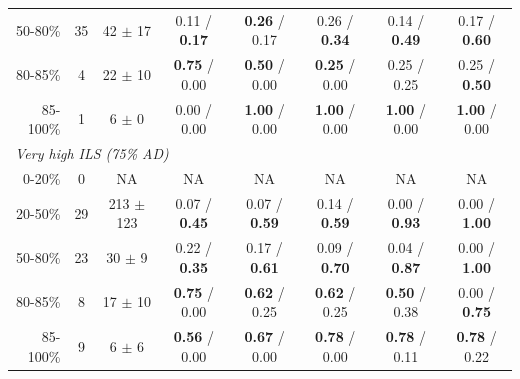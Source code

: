 \begin{landscape}
\begin{table}[!h]
\begin{tabular}{rc cccccc}
50-80\%  & 35 & 42 $\pm$ 17  & 0.11 / {\bf 0.17} & {\bf 0.26} / 0.17 & 0.26 / {\bf 0.34} & 0.14 / {\bf 0.49} & 0.17 / {\bf 0.60} \\[0.5ex]
80-85\%  & 4 & 22 $\pm$ 10  & {\bf 0.75} / 0.00 & {\bf 0.50} / 0.00 & {\bf 0.25} / 0.00 & 0.25 / 0.25 & 0.25 / {\bf 0.50} \\[0.5ex]
85-100\%  & 1 & 6 $\pm$ 0  & 0.00 / 0.00 & {\bf 1.00} / 0.00 & {\bf 1.00} / 0.00 & {\bf 1.00} / 0.00 & {\bf 1.00} / 0.00 \\[2ex]
\multicolumn{8}{l}{\em Very high ILS (75\% AD)}\\[0.5ex]
0-20\%  & 0 & NA & NA & NA & NA & NA & NA \\[0.5ex]
20-50\%  & 29 & 213 $\pm$ 123  & 0.07 / {\bf 0.45} & 0.07 / {\bf 0.59} & 0.14 / {\bf 0.59} & 0.00 / {\bf 0.93} & 0.00 / {\bf 1.00} \\[0.5ex]
50-80\%  & 23 & 30 $\pm$ 9  & 0.22 / {\bf 0.35} & 0.17 / {\bf 0.61} & 0.09 / {\bf 0.70} & 0.04 / {\bf 0.87} & 0.00 / {\bf 1.00} \\[0.5ex]
80-85\%  & 8 & 17 $\pm$ 10  & {\bf 0.75} / 0.00 & {\bf 0.62} / 0.25 & {\bf 0.62} / 0.25 & {\bf 0.50} / 0.38 & 0.00 / {\bf 0.75} \\[0.5ex]
85-100\%  & 9 & 6 $\pm$ 6  & {\bf 0.56} / 0.00 & {\bf 0.67} / 0.00 & {\bf 0.78} / 0.00 & {\bf 0.78} / 0.11 & {\bf 0.78} / 0.22 \\[0.5ex]
\bottomrule
\end{tabular}
\end{table}
\fillandplacepagenumber
\end{landscape}